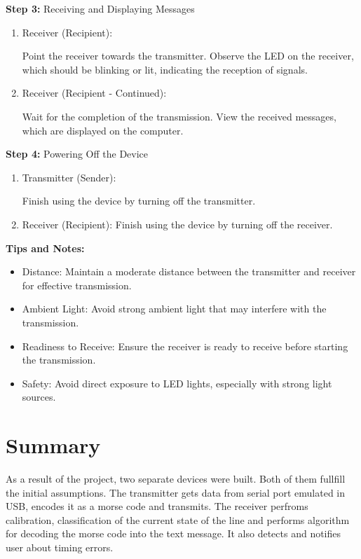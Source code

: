 \documentclass[12pt]{article}
\begin{document}
\noindent\textbf{Step 3:} Receiving and Displaying Messages
\begin{enumerate}
  \item Receiver (Recipient):

Point the receiver towards the transmitter.
Observe the LED on the receiver, which should be blinking or lit, indicating the reception of signals.

\item Receiver (Recipient - Continued):

Wait for the completion of the transmission.
View the received messages, which are displayed on the computer.

\end{enumerate}


\noindent\textbf{Step 4:} Powering Off the Device
\begin{enumerate}
  \item Transmitter (Sender):

Finish using the device by turning off the transmitter.

\item Receiver (Recipient):
Finish using the device by turning off the receiver.

\end{enumerate}
\textbf{Tips and Notes:}
\begin{itemize}
  \item Distance: Maintain a moderate distance between the transmitter and receiver for effective transmission.

  \item Ambient Light: Avoid strong ambient light that may interfere with the transmission.

  \item Readiness to Receive: Ensure the receiver is ready to receive before starting the transmission.

  \item Safety: Avoid direct exposure to LED lights, especially with strong light sources.
\end{itemize}
\newpage	
	\section{Summary}
  As a result of the project, two separate devices were built. Both of them fullfill the initial assumptions.
  The transmitter gets data from serial port emulated in USB, encodes it as a morse code and transmits.
  The receiver perfroms calibration, classification of the current state of the line and performs algorithm for decoding the morse code into the text message.
  It also detects and notifies user about timing errors.
\end{document}
